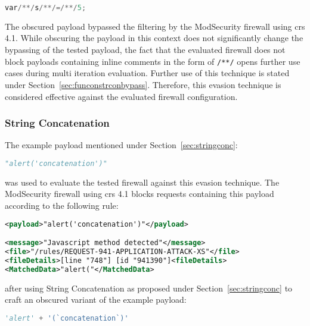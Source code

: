 \begin{lstlisting}[style=basicStyle,language=Python]
var/**/s/**/=/**/5;
\end{lstlisting}

The obscured payload bypassed the filtering by the ModSecurity firewall using \acrshort{crs} 4.1. While obscuring the payload in this context does not significantly change the bypassing of the tested payload, the fact that the evaluated firewall does not block payloads containing inline comments in the form of \verb|/**/| opens further use cases during multi iteration evaluation. Further use of this technique is stated under Section~\ref{sec:funconstrconbypass}. Therefore, this evasion technique is considered effective against the evaluated firewall configuration.

\subsubsection{String Concatenation}
\label{sec:stringconcsingleiter}
The example payload mentioned under Section~\ref{sec:stringconc}:

\begin{lstlisting}[style=basicStyle, language=Python]
"alert('concatenation')"
\end{lstlisting}

was used to evaluate the tested firewall against this evasion technique. The ModSecurity firewall using \acrshort{crs} 4.1 blocks requests containing this payload according to the following rule:

\begin{lstlisting}[style=ruleStyle, language=XML, caption="alert('concatenation')" blocked, label={lst:alertconcblocked}]
<payload>"alert('concatenation')"</payload>

<message>"Javascript method detected"</message>
<file>"/rules/REQUEST-941-APPLICATION-ATTACK-XS"</file>
<fileDetails>[line "748"] [id "941390"]<fileDetails>
<MatchedData>"alert("</MatchedData>
\end{lstlisting}

after using String Concatenation as proposed under Section~\ref{sec:stringconc} to craft an obscured variant of the example payload:

\begin{lstlisting}[style=basicStyle, language=Python, caption='alert' + '(`concatenation`)' bypass, label={lst:strconcbypass}]
'alert' + '(`concatenation`)'
\end{lstlisting}

